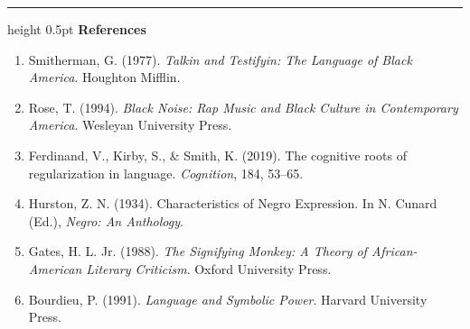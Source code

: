 \documentclass[11pt,letterpaper]{article}
\begin{document}
\vspace{0.4em}
\hrule height 0.5pt \vspace{0.3em}
{\small\sffamily\bfseries References}\\[0.3em]
{\scriptsize\sffamily\color{darkslate}
\begin{enumerate}[leftmargin=1.4em, itemsep=1.5pt]
    \item Smitherman, G. (1977). \textit{Talkin and Testifyin: The Language of Black America}. Houghton Mifflin.
    \item Rose, T. (1994). \textit{Black Noise: Rap Music and Black Culture in Contemporary America}. Wesleyan University Press.
    \item Ferdinand, V., Kirby, S., \& Smith, K. (2019). The cognitive roots of regularization in language. \textit{Cognition}, 184, 53--65.
    \item Hurston, Z. N. (1934). Characteristics of Negro Expression. In N. Cunard (Ed.), \textit{Negro: An Anthology}.
    \item Gates, H. L. Jr. (1988). \textit{The Signifying Monkey: A Theory of African-American Literary Criticism}. Oxford University Press.
    \item Bourdieu, P. (1991). \textit{Language and Symbolic Power}. Harvard University Press.
\end{enumerate}
}
\end{document}
